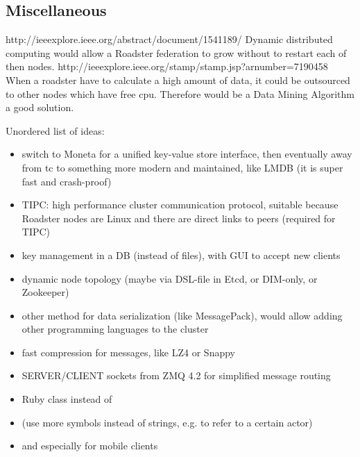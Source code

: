 \subsection{Miscellaneous}
http://ieeexplore.ieee.org/abstract/document/1541189/ Dynamic distributed computing would allow a Roadster federation to grow without to restart each of then nodes.
http://ieeexplore.ieee.org/stamp/stamp.jsp?arnumber=7190458 When a roadster have to calculate a high amount of data, it could be outsourced to other nodes which have free cpu.
Therefore would be a Data Mining Algorithm a good solution.

Unordered list of ideas:
\begin{itemize}
	\item switch to Moneta for a unified key-value store interface, then eventually away from \gls{tc} to something more modern and maintained, like LMDB (it is super fast and crash-proof)
	\item TIPC: high performance cluster communication protocol, suitable because Roadster nodes are Linux and there are direct links to peers (required for TIPC)
	\item key management in a DB (instead of files), with GUI to accept new clients
	\item dynamic node topology (maybe via DSL-file in Etcd, or DIM-only, or Zookeeper)
	\item other method for data serialization (like MessagePack), would allow adding other programming languages to the cluster
	\item fast compression for messages, like LZ4 or Snappy
	\item SERVER/CLIENT sockets from ZMQ 4.2 for simplified message routing
	\item Ruby  class instead of 
	\item (use more symbols instead of strings, e.g. to refer to a certain actor)
	\item {} and  especially for mobile clients
\end{itemize}

